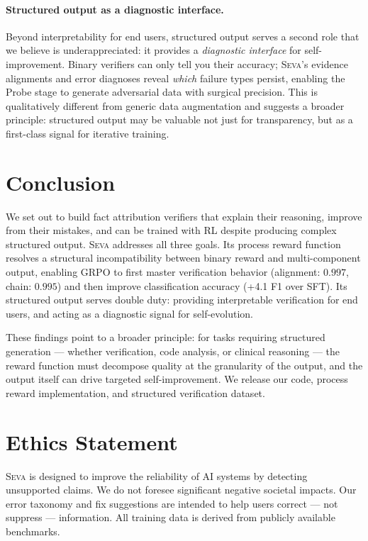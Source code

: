 \documentclass[11pt]{article}
\newcommand{\seva}{\textsc{Seva}\xspace}
\begin{document}
\paragraph{Structured output as a diagnostic interface.}
Beyond interpretability for end users, structured output serves a second role that we believe is underappreciated: it provides a \emph{diagnostic interface} for self-improvement.
Binary verifiers can only tell you their accuracy; \seva's evidence alignments and error diagnoses reveal \emph{which} failure types persist, enabling the Probe stage to generate adversarial data with surgical precision.
This is qualitatively different from generic data augmentation and suggests a broader principle: structured output may be valuable not just for transparency, but as a first-class signal for iterative training.


\FloatBarrier
\section{Conclusion}
\label{sec:conclusion}

We set out to build fact attribution verifiers that explain their reasoning, improve from their mistakes, and can be trained with RL despite producing complex structured output.
\seva addresses all three goals.
Its process reward function resolves a structural incompatibility between binary reward and multi-component output, enabling GRPO to first master verification behavior (alignment: $0.997$, chain: $0.995$) and then improve classification accuracy (+4.1 F1 over SFT).
Its structured output serves double duty: providing interpretable verification for end users, and acting as a diagnostic signal for self-evolution.

These findings point to a broader principle: for tasks requiring structured generation --- whether verification, code analysis, or clinical reasoning --- the reward function must decompose quality at the granularity of the output, and the output itself can drive targeted self-improvement.
We release our code, process reward implementation, and structured verification dataset.


\section*{Ethics Statement}
\seva is designed to improve the reliability of AI systems by detecting unsupported claims.
We do not foresee significant negative societal impacts.
Our error taxonomy and fix suggestions are intended to help users correct --- not suppress --- information.
All training data is derived from publicly available benchmarks.
\end{document}
